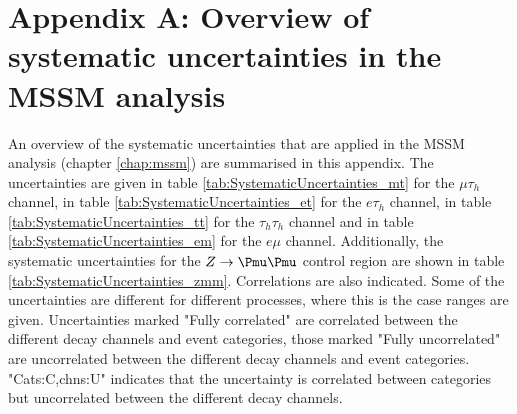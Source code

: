 \appendix
\chapter*{\texorpdfstring{Appendix A: Overview of systematic uncertainties in the MSSM \AHtotautau analysis}{Overview of systematic uncertainties in the MSSM A/H to tautau analysis}}
\label{appendix:uncerts}
An overview of the systematic uncertainties that are applied in the MSSM \AHtotautau analysis (chapter \ref{chap:mssm})
are summarised in this appendix. The uncertainties are given in
table \ref{tab:SystematicUncertainties_mt} for the $\mu\tau_h$
channel, in table \ref{tab:SystematicUncertainties_et} for the $e\tau_h$ channel,
in table \ref{tab:SystematicUncertainties_tt} for the $\tau_h\tau_h$ channel and
in table \ref{tab:SystematicUncertainties_em} for the $e\mu$ channel. Additionally,
the systematic uncertainties for the $Z\rightarrow\mumu$ control region are shown
in table \ref{tab:SystematicUncertainties_zmm}. Correlations are also indicated.
Some of the uncertainties
are different for different processes, where this is the case ranges are given.
Uncertainties marked "Fully correlated" are correlated between the different
decay channels and event categories, those marked "Fully uncorrelated" are
uncorrelated between the different decay channels and event categories. "Cats:C,chns:U"
indicates that the uncertainty is correlated between categories but uncorrelated between
the different decay channels.




